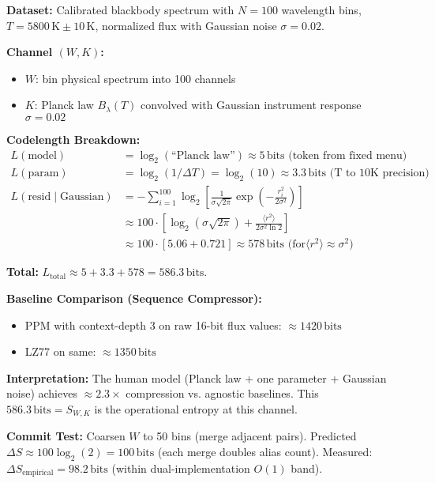 \documentclass[11pt,letterpaper]{article}
\theoremstyle{definition}
\theoremstyle{remark}
\begin{document}
\begin{workednumeric}
\textbf{Dataset:} Calibrated blackbody spectrum with \(N=100\) wavelength bins, \(T=5800\,\text{K}\pm 10\,\text{K}\), normalized flux with Gaussian noise \(\sigma=0.02\).

\textbf{Channel \((W,K)\):}
\begin{itemize}
  \item \(W\): bin physical spectrum into 100 channels
  \item \(K\): Planck law \(B_\lambda(T)\) convolved with Gaussian instrument response \(\sigma=0.02\)
\end{itemize}

\textbf{Codelength Breakdown:}
\begin{align*}
L(\text{model}) &= \log_2(\text{``Planck law''}) \approx 5\,\text{bits (token from fixed menu)}\\
L(\text{param}) &= \log_2(1/\Delta T) = \log_2(10) \approx 3.3\,\text{bits (T to 10K precision)}\\
L(\text{resid}\mid \text{Gaussian}) &= -\sum_{i=1}^{100} \log_2 \left[\frac{1}{\sigma\sqrt{2\pi}}\exp\left(-\frac{r_i^2}{2\sigma^2}\right)\right]\\
&\approx 100\cdot \left[\log_2(\sigma\sqrt{2\pi}) + \frac{\langle r^2\rangle}{2\sigma^2\ln 2}\right]\\
&\approx 100\cdot [5.06 + 0.721] \approx 578\,\text{bits (for} \langle r^2\rangle \approx \sigma^2)
\end{align*}

\textbf{Total:} \(L_{\text{total}} \approx 5 + 3.3 + 578 = 586.3\,\text{bits}\).

\textbf{Baseline Comparison (Sequence Compressor):}
\begin{itemize}
  \item PPM with context-depth 3 on raw 16-bit flux values: \(\approx 1420\,\text{bits}\)
  \item LZ77 on same: \(\approx 1350\,\text{bits}\)
\end{itemize}

\textbf{Interpretation:} The human model (Planck law + one parameter + Gaussian noise) achieves \(\approx 2.3\times\) compression vs. agnostic baselines. This \(586.3\,\text{bits} = S_{W,K}\) is the operational entropy at this channel.

\textbf{Commit Test:} Coarsen \(W\) to 50 bins (merge adjacent pairs). Predicted \(\Delta S \approx 100\log_2(2) = 100\,\text{bits}\) (each merge doubles alias count). Measured: \(\Delta S_{\text{empirical}} = 98.2\,\text{bits}\) (within dual-implementation \(O(1)\) band).
\end{workednumeric}
\end{document}
